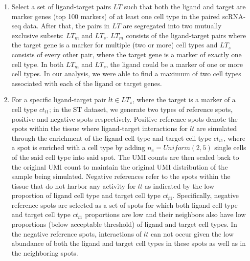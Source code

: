 \begin{enumerate}
    \item Select a set of ligand-target pairs $LT$ such that both the ligand and target are marker genes (top 100 markers) of at least one cell type in the paired scRNA-seq data. After that, the pairs in $LT$ are segregated into two mutually exclusive subsets: $LT_{m}$ and $LT_{s}$. $LT_{m}$ consists of the ligand-target pairs where the target gene is a marker for multiple (two or more) cell types and $LT_{s}$ consists of every other pair, where the target gene is a marker of exactly one cell type. In both $LT_{m}$ and $LT_{s}$, the ligand could be a marker of one or more cell types. In our analysis, we were able to find a maximum of two cell types associated with each of the ligand or target genes.
    \item For a specific ligand-target pair $lt \in LT_{s}$, where the target is a marker of a cell type $ct_{t1}$; in the ST dataset, we generate two types of reference spots, positive and negative spots respectively. Positive reference spots denote the spots within the tissue where ligand-target interactions for $lt$ are simulated through the enrichment of the ligand cell type and target cell type $ct_{t1}$, where a spot is enriched with a cell type by adding $n_e = Uniform(2,5)$ single cells of the said cell type into said spot. The UMI counts are then scaled back to the original UMI count to maintain the original UMI distribution of the sample being simulated. Negative references refer to the spots within the tissue that do not harbor any activity for $lt$ as indicated by the low proportion of ligand cell type and target cell type $ct_{t1}$. Specifically, negative reference spots are selected as a set of spots for which both ligand cell type and target cell type $ct_{t1}$ proportions are low and their neighbors also have low proportions (below acceptable threshold) of ligand and target cell types. In the negative reference spots, interactions of $lt$ can not occur given the low abundance of both the ligand and target cell types in these spots as well as in the neighboring spots.

\end{enumerate}

